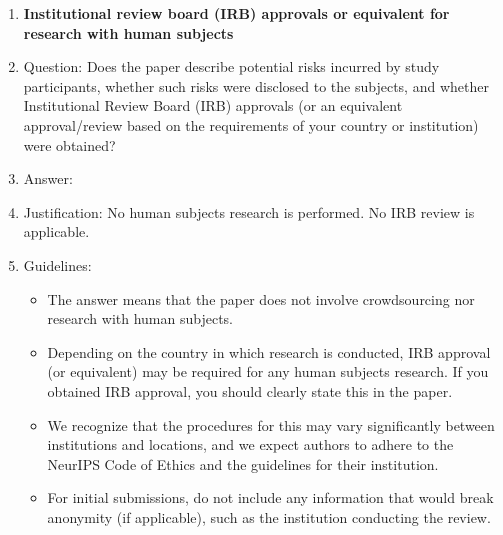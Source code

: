 \begin{enumerate}
\item {\bf Institutional review board (IRB) approvals or equivalent for research with human subjects}
    \item[] Question: Does the paper describe potential risks incurred by study participants, whether such risks were disclosed to the subjects, and whether Institutional Review Board (IRB) approvals (or an equivalent approval/review based on the requirements of your country or institution) were obtained?
    \item[] Answer: \answerNA{}
    \item[] Justification: No human subjects research is performed. No IRB review is applicable.
    \item[] Guidelines:
    \begin{itemize}
        \item The answer \answerNA{} means that the paper does not involve crowdsourcing nor research with human subjects.
        \item Depending on the country in which research is conducted, IRB approval (or equivalent) may be required for any human subjects research. If you obtained IRB approval, you should clearly state this in the paper.
        \item We recognize that the procedures for this may vary significantly between institutions and locations, and we expect authors to adhere to the NeurIPS Code of Ethics and the guidelines for their institution.
        \item For initial submissions, do not include any information that would break anonymity (if applicable), such as the institution conducting the review.
    \end{itemize}


\end{enumerate}
